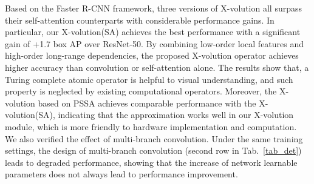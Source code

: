 \documentclass{article}
\begin{document}
Based on the Faster R-CNN framework, three versions of X-volution all surpass their self-attention counterparts with considerable performance gains.
In particular, our X-volution(SA) achieves the best performance with a significant gain of +1.7 box AP over ResNet-50.
By combining low-order local features and high-order long-range dependencies, the proposed X-volution operator achieves higher accuracy than convolution or self-attention alone.
The results show that, a Turing complete atomic operator is helpful to visual understanding, and such property is neglected by existing computational operators.
Moreover, the X-volution based on PSSA achieves comparable performance with the X-volution(SA), indicating that the approximation works well in our X-volution module, which is more friendly to hardware implementation and computation.
We also verified the effect of multi-branch convolution. Under the same training settings, the design of multi-branch convolution (second row in Tab.~\ref{tab_det}) leads to degraded performance, showing that the increase of network learnable parameters does not always lead to performance improvement.
\end{document}
